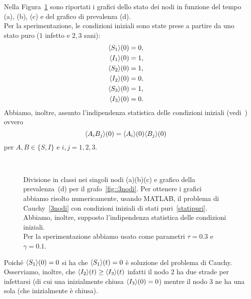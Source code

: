 Nella Figura~\ref{fig::spe3nodi} sono riportati i grafici dello stato dei nodi in funzione del tempo (a), (b), (c) e del grafico di prevalenza (d).\\
Per la sperimentazione, le condizioni iniziali sono state prese a partire da uno stato puro ($1$ infetto e $2,3$ sani):
\begin{equation}
\label{statipuri}
\begin{aligned}
\langle S_1 \rangle(0)&=0, \\
\langle I_1 \rangle(0) &=1, \\
\langle S_2 \rangle(0)&=1,\\
\langle I_2 \rangle(0)& = 0,\\ 
\langle S_3 \rangle(0)&= 1,\\
\langle I_3 \rangle(0) &= 0.\\
\end{aligned}
\end{equation}
Abbiamo, inoltre, assunto l'indipendenza statistica delle condizioni iniziali (vedi~\cite{MR3340258}) ovvero
$$
\langle A_i B_j \rangle(0) =\langle A_i \rangle(0) \langle B_j \rangle(0)$$ 
per $A,B\in \{ S, I\}$ e  $i,j=1, 2,3$.\\

\begin{figure}[h]
	\centering
	\subfloat[][Nodo 1]{}
	\subfloat[][Nodo 2]{}
	\\
	\subfloat[][Nodo 3]{}
	\subfloat[][Prevalenza]{}
	\caption[Sperimentazione in MATLAB relativo al grafo~\ref{fig::3nodi}]{Divisione in classi nei singoli nodi (a)(b)(c) e grafico della prevalenza~(d) per il grafo~\ref{fig::3nodi}.   Per ottenere i grafici abbiamo risolto numericamente,  usando MATLAB,  il problema di Cauchy~\eqref{3nodi} con condizioni iniziali  di stati puri~\eqref{statipuri}. Abbiamo,  inoltre,  supposto l'indipendenza statistica delle condizioni iniziali.\\
		Per la sperimentazione abbiamo usato come parametri $\tau= 0.3$ e $\gamma =0.1 $.}\label{fig::spe3nodi}
\end{figure}
Poich\'e $\langle S_1 \rangle(0)=0$ si ha che $\langle S_1 \rangle(t)=0$ \`e soluzione del problema di Cauchy.  Osserviamo,  inoltre, che $\langle I_2 \rangle(t)\geq \langle I_3 \rangle(t)$ infatti il nodo $2$ ha due strade per infettarsi (di cui una inizialmente chiusa $\langle I_3 \rangle(0)=0$) mentre il nodo $3$ ne ha una sola (che inizialmente \`e chiusa). 





